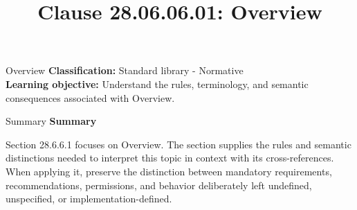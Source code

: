 \documentclass[10pt,letterpaper]{article}
\title{Clause 28.06.06.01: Overview}
\author{}
\date{}
\begin{document}
\maketitle
\begin{CornellOverviewBox}{Overview}
\textbf{Classification:} Standard library - Normative\\[2pt]
\textbf{Learning objective:} Understand the rules, terminology, and semantic consequences associated with Overview.
\end{CornellOverviewBox}\begin{CornellSummaryBox}{Summary}
{\sffamily\bfseries\color{Accent} Summary}\par\vspace{3pt}Section 28.6.6.1 focuses on Overview. The section supplies the rules and semantic distinctions needed to interpret this topic in context with its cross-references. When applying it, preserve the distinction between mandatory requirements, recommendations, permissions, and behavior deliberately left undefined, unspecified, or implementation-defined.
\end{CornellSummaryBox}
\end{document}
